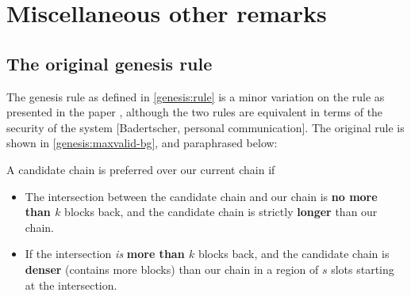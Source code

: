 \section{Miscellaneous other remarks}

\subsection{The original genesis rule}
\label{genesis:original}

The genesis rule as defined in \cref{genesis:rule} is a minor variation on
the rule as presented in the paper \cite{cryptoeprint:2018:378}, although
the two rules are equivalent in terms of the security of the system
[Badertscher, personal communication]. The original rule is shown in
\cref{genesis:maxvalid-bg}, and paraphrased below:

\begin{definition}
\label{genesis:originalrule}
A candidate chain is preferred over our current chain if

\begin{itemize}
\item The intersection between the candidate chain and our chain is \textbf{no
more than $k$} blocks back, and the candidate chain is strictly \textbf{longer}
than our chain.

\item If the intersection \emph{is} \textbf{more than $k$} blocks back, and the
candidate chain is \textbf{denser} (contains more blocks) than our chain in
a region of $s$ slots starting at the intersection.
\end{itemize}
\end{definition}

